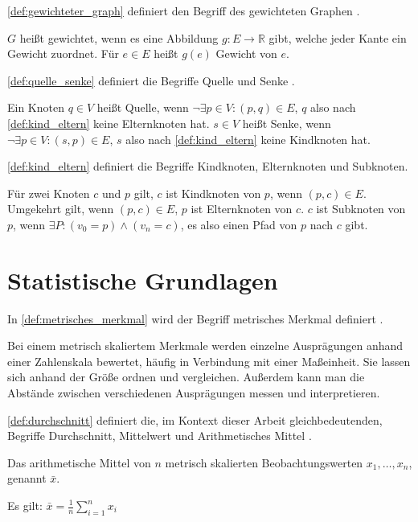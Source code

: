 \autoref{def:gewichteter_graph} definiert den Begriff des gewichteten Graphen
\autocite[vgl.][S.253]{AlgorithmenUndDatenstrukturen}.
\begin{definition}
    $G$ heißt gewichtet, wenn es eine Abbildung $g:E\rightarrow \mathbb{R}$
    gibt, welche jeder Kante ein Gewicht zuordnet. Für $e\in E$ heißt $g(e)$
    Gewicht von $e$.
    \label{def:gewichteter_graph}
\end{definition}

\autoref{def:quelle_senke} definiert die Begriffe Quelle und Senke
\autocite[vgl.][S.306]{AlgorithmenUndDatenstrukturen}.
\begin{definition}
    Ein Knoten $q \in V$ heißt Quelle, wenn $ \neg \exists p \in V: (p,q) \in E
    $, $q$ also nach \autoref{def:kind_eltern} keine Elternknoten hat.
    $s \in V$ heißt Senke, wenn $ \neg \exists p \in V: (s,p) \in E $, $s$ also
    nach \autoref{def:kind_eltern} keine Kindknoten hat.
    \label{def:quelle_senke}
\end{definition}

\autoref{def:kind_eltern} definiert die Begriffe Kindknoten, Elternknoten und
Subknoten.
\begin{definition}
    Für zwei Knoten $c$ und $p$ gilt, $c$ ist Kindknoten von $p$, wenn $(p,c)\in E$.
    Umgekehrt gilt, wenn $(p,c)\in E$, $p$ ist Elternknoten von $c$.
    $c$ ist Subknoten von $p$, wenn $\exists P: (v_0=p) \land (v_n=c)$, es also
    einen Pfad von $p$ nach $c$ gibt.
    \label{def:kind_eltern}
\end{definition}

\section{Statistische Grundlagen}
\label{sec:statistische_grundlagen}
In \autoref{def:metrisches_merkmal} wird der Begriff metrisches Merkmal
definiert  \autocite[vgl.][S.24]{Statistik}.
\begin{definition}
    Bei einem metrisch skaliertem Merkmale werden einzelne Ausprägungen anhand
    einer Zahlenskala bewertet, häufig in Verbindung mit einer Maßeinheit. Sie
    lassen sich anhand der Größe ordnen und vergleichen. Außerdem kann man die
    Abstände zwischen verschiedenen Ausprägungen messen und interpretieren.
    \label{def:metrisches_merkmal}
\end{definition}

\autoref{def:durchschnitt} definiert die, im Kontext dieser Arbeit gleichbedeutenden, Begriffe
Durchschnitt, Mittelwert und Arithmetisches Mittel \autocite[vgl.][S.52f]{Statistik}.
\begin{definition}
    Das arithmetische Mittel von $n$ metrisch skalierten Beobachtungswerten
    $x_1,\dots,x_n$, genannt $\bar{x}$. 

    Es gilt: $\bar{x} = \frac{1}{n} \displaystyle\sum^{n}_{i=1}x_i$

    \label{def:durchschnitt}
\end{definition}

